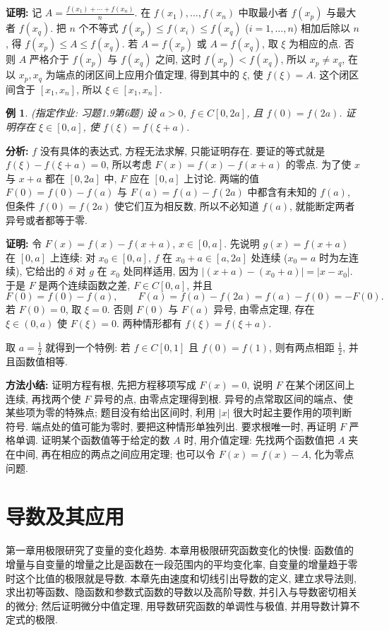 \documentclass[UTF8,openany]{ctexbook}
\theoremstyle{chinesetextbook}
\newtheorem{example}{例}[section]
\newenvironment{cnproof}{\par\indent\textbf{证明:} \ignorespaces}{\par}
\begin{document}
\begin{cnproof}
记 $\displaystyle A=\frac{f(x_1)+\cdots+f(x_n)}n$. 在 $f(x_1),\ldots,f(x_n)$ 中取最小者 $f(x_p)$ 与最大者 $f(x_q)$. 把 $n$ 个不等式 $f(x_p)\le f(x_i)\le f(x_q)$ ($i=1,\ldots,n$) 相加后除以 $n$, 得 $f(x_p)\le A\le f(x_q)$. 若 $A=f(x_p)$ 或 $A=f(x_q)$, 取 $\xi$ 为相应的点. 否则 $A$ 严格介于 $f(x_p)$ 与 $f(x_q)$ 之间, 这时 $f(x_p)<f(x_q)$, 所以 $x_p\ne x_q$, 在以 $x_p,x_q$ 为端点的闭区间上应用介值定理, 得到其中的 $\xi$, 使 $f(\xi)=A$. 这个闭区间含于 $[x_1,x_n]$, 所以 $\xi\in[x_1,x_n]$.
\end{cnproof}
\begin{example}
\textnormal{(指定作业: 习题1.9第6题)} 设 $a>0$, $f\in C[0,2a]$, 且 $f(0)=f(2a)$. 证明存在 $\xi\in[0,a]$, 使 $f(\xi)=f(\xi+a)$.
\end{example}
\par\indent\textbf{分析:} $f$ 没有具体的表达式, 方程无法求解, 只能证明存在. 要证的等式就是 $f(\xi)-f(\xi+a)=0$, 所以考虑 $F(x)=f(x)-f(x+a)$ 的零点. 为了使 $x$ 与 $x+a$ 都在 $[0,2a]$ 中, $F$ 应在 $[0,a]$ 上讨论. 两端的值 $F(0)=f(0)-f(a)$ 与 $F(a)=f(a)-f(2a)$ 中都含有未知的 $f(a)$, 但条件 $f(0)=f(2a)$ 使它们互为相反数, 所以不必知道 $f(a)$, 就能断定两者异号或者都等于零.
\begin{cnproof}
令 $F(x)=f(x)-f(x+a)$, $x\in[0,a]$. 先说明 $g(x)=f(x+a)$ 在 $[0,a]$ 上连续: 对 $x_0\in[0,a]$, $f$ 在 $x_0+a\in[a,2a]$ 处连续 ($x_0=a$ 时为左连续), 它给出的 $\delta$ 对 $g$ 在 $x_0$ 处同样适用, 因为 $|(x+a)-(x_0+a)|=|x-x_0|$. 于是 $F$ 是两个连续函数之差, $F\in C[0,a]$, 并且
\[
F(0)=f(0)-f(a),\qquad F(a)=f(a)-f(2a)=f(a)-f(0)=-F(0).
\]
若 $F(0)=0$, 取 $\xi=0$. 否则 $F(0)$ 与 $F(a)$ 异号, 由零点定理, 存在 $\xi\in(0,a)$ 使 $F(\xi)=0$. 两种情形都有 $f(\xi)=f(\xi+a)$.
\end{cnproof}
取 $\displaystyle a=\frac12$ 就得到一个特例: 若 $f\in C[0,1]$ 且 $f(0)=f(1)$, 则有两点相距 $\displaystyle\frac12$, 并且函数值相等.

\par\indent\textbf{方法小结:} 证明方程有根, 先把方程移项写成 $F(x)=0$, 说明 $F$ 在某个闭区间上连续, 再找两个使 $F$ 异号的点, 由零点定理得到根. 异号的点常取区间的端点、使某些项为零的特殊点; 题目没有给出区间时, 利用 $|x|$ 很大时起主要作用的项判断符号. 端点处的值可能为零时, 要把这种情形单独列出. 要求根唯一时, 再证明 $F$ 严格单调. 证明某个函数值等于给定的数 $A$ 时, 用介值定理: 先找两个函数值把 $A$ 夹在中间, 再在相应的两点之间应用定理; 也可以令 $F(x)=f(x)-A$, 化为零点问题.
\chapter{导数及其应用}
第一章用极限研究了变量的变化趋势. 本章用极限研究函数变化的快慢: 函数值的增量与自变量的增量之比是函数在一段范围内的平均变化率, 自变量的增量趋于零时这个比值的极限就是导数. 本章先由速度和切线引出导数的定义, 建立求导法则, 求出初等函数、隐函数和参数式函数的导数以及高阶导数, 并引入与导数密切相关的微分; 然后证明微分中值定理, 用导数研究函数的单调性与极值, 并用导数计算不定式的极限.
\end{document}
